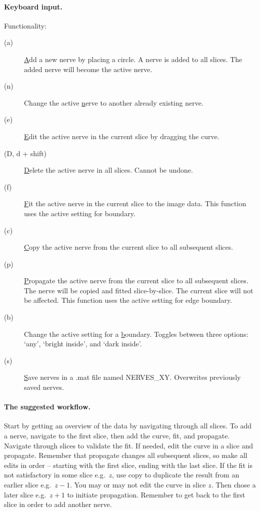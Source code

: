 \documentclass[paper=a4, fontsize=8pt]{article}
\begin{document}
\paragraph{Keyboard input.} Functionality:
\begin{description}
		\item[(a)] \underline{A}dd a new nerve by placing a circle. A nerve is added to all slices. The added nerve will become the active nerve.
		\item[(n)] Change the active \underline{n}erve to another already existing nerve. 
		\item[(e)] \underline{E}dit the active nerve in the current slice by dragging the curve.
		\item[(D, d + shift)] \underline{D}elete the active nerve in all slices. Cannot be undone.
		\item[(f)] \underline{F}it the active nerve in the current slice to the image data. This function uses the active setting for boundary. %
		\item[(c)] \underline{C}opy the active nerve from the current slice to all subsequent slices. %
		\item[(p)] \underline{P}ropagate the active nerve from the current slice to all subsequent slices. The nerve will be copied and fitted slice-by-slice. The current slice will not be affected. This function uses the active setting for edge boundary. %
		\item[(b)] Change the active setting for a \underline{b}oundary. Toggles between three options: `any', `bright inside', and `dark inside'.
		\item[(s)] \underline{S}ave nerves in a .mat file named NERVES\_XY. Overwrites previously saved nerves.
\end{description}

\paragraph{The suggested workflow.}
Start by getting an overview of the data by navigating through all slices. To add a nerve, navigate to the first slice, then add the curve, fit, and propagate. Navigate through slices to validate the fit. If needed, edit the curve in a slice and propagate. Remember that propagate changes all subsequent slices, so make all edits in order -- starting with the first slice, ending with the last slice. If the fit is not satisfactory in some slice e.g.\ $z$, use copy to duplicate the result from an earlier slice e.g.\ $z-1$. You may or may not edit the curve in slice $z$. Then chose a later slice e.g.\ $z+1$ to initiate propagation. Remember to get back to the first slice in order to add another nerve.    
\end{document}
